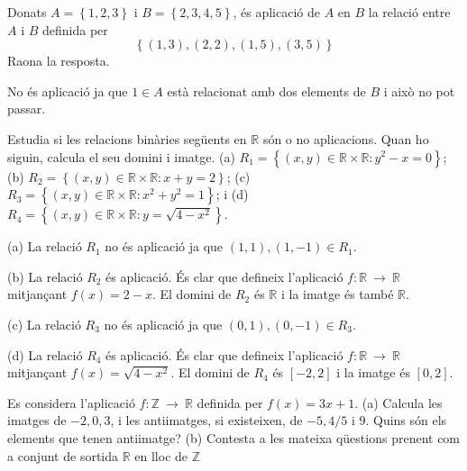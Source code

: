 \begin{exercici}
Donats $A=\left\{ 1,2,3\right\} $ i $B=\left\{ 2,3,4,5\right\} $, és
aplicació de $A$ en $B$ la relació entre $A$ i $B$ definida per%
\begin{equation*}
\left\{ (1,3),(2,2),(1,5),(3,5)\right\}
\end{equation*}%
Raona la resposta.
\end{exercici}

\begin{solucio}
No és aplicació ja que $1\in A$ està relacionat amb dos elements
de $B$ i això no pot passar.
\end{solucio}

\begin{exercici}
Estudia si les relacions binàries següents en $\mathbb{R}$ són o
no aplicacions. Quan ho siguin, calcula el seu domini i imatge. (a) $%
R_{1}=\left\{ (x,y)\in \mathbb{R}\times \mathbb{R}:y^{2}-x=0\right\} $; (b) $%
R_{2}=\left\{ (x,y)\in \mathbb{R}\times \mathbb{R}:x+y=2\right\} $; (c) $%
R_{3}=\left\{ (x,y)\in \mathbb{R}\times \mathbb{R}:x^{2}+y^{2}=1\right\} $;
i (d) $R_{4}=\left\{ (x,y)\in \mathbb{R}\times \mathbb{R}:y=\sqrt{4-x^{2}}%
\right\} $.
\end{exercici}

\begin{solucio}
(a) La relació $R_{1}$ no és aplicació ja que $(1,1),(1,-1)\in
R_{1}$.

(b) La relació $R_{2}$ és aplicació. És clar que defineix
l'aplicació $f:\mathbb{R}~\longrightarrow ~\mathbb{R}$ mitjançant $%
f(x)=2-x$. El domini de $R_{2}$ és $\mathbb{R}$ i la imatge és també $\mathbb{R}$.

(c) La relació $R_{3}$ no és aplicació ja que $(0,1),(0,-1)\in
R_{3}$.

(d) La relació $R_{4}$ és aplicació. És clar que defineix
l'aplicació $f:\mathbb{R}~\longrightarrow ~\mathbb{R}$ mitjançant $%
f(x)=\sqrt{4-x^{2}}$. El domini de $R_{4}$ és $[-2,2]$ i la imatge és $[0,2]$.
\end{solucio}

\begin{exercici}
Es considera l'aplicació $f:\mathbb{Z}~\longrightarrow ~\mathbb{R}$
definida per $f(x)=3x+1$. (a) Calcula les imatges de $-2,0,3$, i les
antiimatges, si existeixen, de $-5,4/5$ i $9$. Quins són els elements
que tenen antiimatge? (b) Contesta a les mateixa qüestions prenent com a
conjunt de sortida $\mathbb{R}$ en lloc de $\mathbb{Z}$
\end{exercici}

